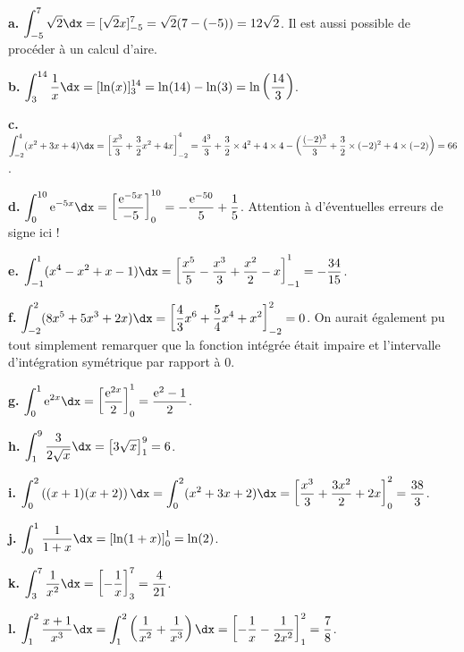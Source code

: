\documentclass[11pt,fleqn, openany]{book} %
\begin{document}
\begin{solution}

\textbf{a.} \(\displaystyle\int_{-5}^{7} \sqrt{2} \dx = [\sqrt{2}x]_{-5}^7=\sqrt{2}(7-(-5))=12\sqrt{2}\). Il est aussi possible de procéder à un calcul d'aire.

\textbf{b.} \(\displaystyle\int_{3}^{14} \dfrac{1}{x} \dx = [\ln(x)]_3^{14}=\ln(14)-\ln(3)=\ln\left(\dfrac{14}{3}\right)\).

\textbf{c.}  \(\displaystyle\int_{-2}^4 (x^2+3x+4) \dx = \left[\dfrac{x^3}{3}+\dfrac{3}{2}x^2+4x\right]_{-2}^4= \dfrac{4^3}{3}+\dfrac{3}{2}\times 4^2 + 4 \times 4 -\left( \dfrac{(-2)^3}{3}+\dfrac{3}{2}\times (-2)^2+4\times (-2)\right)=66\).

\textbf{d.} \(\displaystyle\int_{0}^{10} \e^{-5x} \dx = \left[ \dfrac{\e^{-5x}}{-5}\right]_0^{10}= -\dfrac{\e^{-50}}{5}+\dfrac{1}{5}\). Attention à d'éventuelles erreurs de signe ici !

\textbf{e.} \(\displaystyle\int_{-1}^{1} (x^4-x^2+x-1) \dx = \left[\dfrac{x^5}{5}-\dfrac{x^3}{3}+\dfrac{x^2}{2}-x\right]_{-1}^{1}=-\dfrac{34}{15}\).

\textbf{f.} \(\displaystyle\int_{-2}^{2} (8x^5+5x^3+2x) \dx = \left[\dfrac{4}{3}x^6+\dfrac{5}{4}x^4+x^2\right]_{-2}^2=0\). On aurait également pu tout simplement remarquer que la fonction intégrée était impaire et l'intervalle d'intégration symétrique par rapport à 0.

\textbf{g.} \(\displaystyle\int_{0}^1 \e^{2x} \dx=\left[\dfrac{\e^{2x}}{2}\right]_0^1=\dfrac{\e^2-1}{2}\).

\textbf{h.} \(\displaystyle\int_{1}^{9} \dfrac{3}{2\sqrt{x}} \dx = \left[3\sqrt{x}\right]_1^9=6\).

\textbf{i.}  \(\displaystyle\int_{0}^{2} \left((x+1)(x+2)\right) \dx = \displaystyle\int_{0}^{2} (x^2+3x+2)\dx = \left[\dfrac{x^3}{3}+\dfrac{3x^2}{2}+2x\right]_0^2 = \dfrac{38}{3}\).

\textbf{j.} \(\displaystyle\int_{0}^{1} \dfrac{1}{1+x} \dx = \left[ \ln(1+x) \right]_0^1=\ln(2)\).

\textbf{k.} \(\displaystyle\int_3^7 \dfrac{1}{x^2}\dx = \left[-\dfrac{1}{x}\right]_3^7 = \dfrac{4}{21}\).

\textbf{l.} \(\displaystyle\int_1^2 \dfrac{x+1}{x^3}\dx = \displaystyle\int_1^2 \left(\dfrac{1}{x^2}+\dfrac{1}{x^3}\right)\dx = \left[-\dfrac{1}{x}-\dfrac{1}{2x^2}\right]_1^2 = \dfrac{7}{8} \).
\end{solution}
 
 
\end{document}
